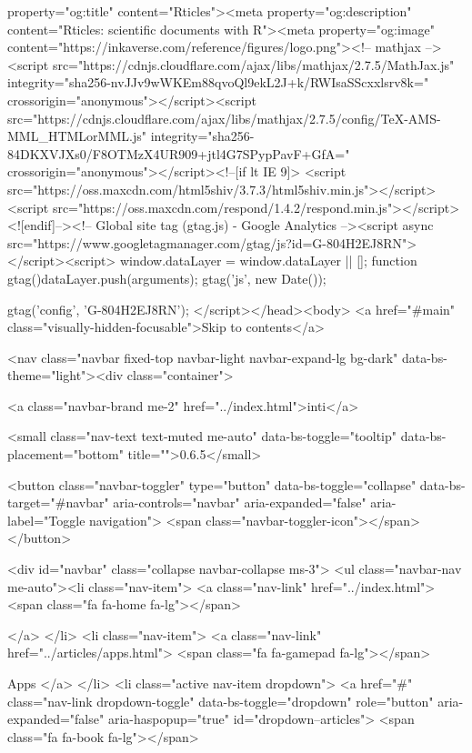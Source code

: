 property="og:title" content="Rticles"><meta property="og:description" content="Rticles: scientific documents with R"><meta property="og:image" content="https://inkaverse.com/reference/figures/logo.png"><!-- mathjax --><script src="https://cdnjs.cloudflare.com/ajax/libs/mathjax/2.7.5/MathJax.js" integrity="sha256-nvJJv9wWKEm88qvoQl9ekL2J+k/RWIsaSScxxlsrv8k=" crossorigin="anonymous"></script><script src="https://cdnjs.cloudflare.com/ajax/libs/mathjax/2.7.5/config/TeX-AMS-MML_HTMLorMML.js" integrity="sha256-84DKXVJXs0/F8OTMzX4UR909+jtl4G7SPypPavF+GfA=" crossorigin="anonymous"></script><!--[if lt IE 9]>
<script src="https://oss.maxcdn.com/html5shiv/3.7.3/html5shiv.min.js"></script>
<script src="https://oss.maxcdn.com/respond/1.4.2/respond.min.js"></script>
<![endif]--><!-- Global site tag (gtag.js) - Google Analytics --><script async src="https://www.googletagmanager.com/gtag/js?id=G-804H2EJ8RN"></script><script>
  window.dataLayer = window.dataLayer || [];
  function gtag(){dataLayer.push(arguments);}
  gtag('js', new Date());

  gtag('config', 'G-804H2EJ8RN');
</script></head><body>
    <a href="#main" class="visually-hidden-focusable">Skip to contents</a>
    

    <nav class="navbar fixed-top navbar-light navbar-expand-lg bg-dark" data-bs-theme="light"><div class="container">
    
    <a class="navbar-brand me-2" href="../index.html">inti</a>

    <small class="nav-text text-muted me-auto" data-bs-toggle="tooltip" data-bs-placement="bottom" title="">0.6.5</small>

    
    <button class="navbar-toggler" type="button" data-bs-toggle="collapse" data-bs-target="#navbar" aria-controls="navbar" aria-expanded="false" aria-label="Toggle navigation">
      <span class="navbar-toggler-icon"></span>
    </button>

    <div id="navbar" class="collapse navbar-collapse ms-3">
      <ul class="navbar-nav me-auto"><li class="nav-item">
  <a class="nav-link" href="../index.html">
    <span class="fa fa-home fa-lg"></span>
     
  </a>
</li>
<li class="nav-item">
  <a class="nav-link" href="../articles/apps.html">
    <span class="fa fa-gamepad fa-lg"></span>
     
    Apps
  </a>
</li>
<li class="active nav-item dropdown">
  <a href="#" class="nav-link dropdown-toggle" data-bs-toggle="dropdown" role="button" aria-expanded="false" aria-haspopup="true" id="dropdown--articles">
    <span class="fa fa-book fa-lg"></span>
     
